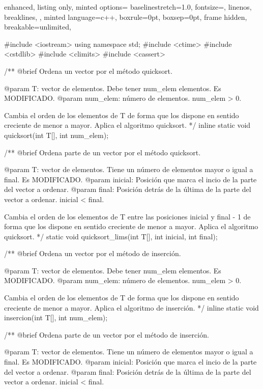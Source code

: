 \documentclass[12pt,spanish]{article}
\begin{document}
\begin{multicols}{2}
\begin{tcblisting}
{
  enhanced,
  listing only,
  minted options={
    baselinestretch=1.0,
    fontsize=\footnotesize,
    linenos,
    breaklines,
  },
  minted language=c++,
  boxrule=0pt,
  boxsep=0pt,
  frame hidden,
  breakable=unlimited,
}
  
#include <iostream>
using namespace std;
#include <ctime>
#include <cstdlib>
#include <climits>
#include <cassert>

/**
   @brief Ordena un vector por el método quicksort.

   @param T: vector de elementos. Debe tener num_elem elementos.
             Es MODIFICADO.
   @param num_elem: número de elementos. num_elem > 0.

   Cambia el orden de los elementos de T de forma que los dispone
   en sentido creciente de menor a mayor.
   Aplica el algoritmo quicksort.
*/
inline static 
void quicksort(int T[], int num_elem);

/**
   @brief Ordena parte de un vector por el método quicksort.

   @param T: vector de elementos. Tiene un número de elementos 
                   mayor o igual a final. Es MODIFICADO.
   @param inicial: Posición que marca el incio de la parte del
                   vector a ordenar.
   @param final: Posición detrás de la última de la parte del
                   vector a ordenar. 
		   inicial < final.

   Cambia el orden de los elementos de T entre las posiciones
   inicial y final - 1 de forma que los dispone en sentido creciente
   de menor a mayor.
   Aplica el algoritmo quicksort.
*/
static void quicksort_lims(int T[], int inicial, int final);


/**
   @brief Ordena un vector por el método de inserción.

   @param T: vector de elementos. Debe tener num_elem elementos.
             Es MODIFICADO.
   @param num_elem: número de elementos. num_elem > 0.

   Cambia el orden de los elementos de T de forma que los dispone
   en sentido creciente de menor a mayor.
   Aplica el algoritmo de inserción.
*/
inline static 
void insercion(int T[], int num_elem);

/**
   @brief Ordena parte de un vector por el método de inserción.

   @param T: vector de elementos. Tiene un número de elementos 
                   mayor o igual a final. Es MODIFICADO.
   @param inicial: Posición que marca el incio de la parte del
                   vector a ordenar.
   @param final: Posición detrás de la última de la parte del
                   vector a ordenar. 
		   inicial < final.


\end{tcblisting}
\end{multicols}
\end{document}
